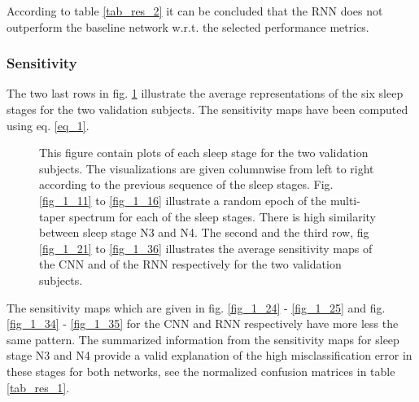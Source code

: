 According to table \ref{tab_res_2} it can be concluded that the RNN does not outperform the baseline network w.r.t. the selected performance metrics.

%

\subsubsection{Sensitivity}

The two last rows in fig. \ref{fig_1} illustrate the average representations of the six sleep stages for the two validation subjects. The sensitivity maps have been computed using eq. \ref{eq_1}.

\begin{figure*}[th!]
\centering

\caption{This figure contain plots of each sleep stage for the two validation subjects. The visualizations are given columnwise from left to right according to the previous sequence of the sleep stages. Fig. \ref{fig_1_11} to \ref{fig_1_16} illustrate a random epoch of the multi-taper spectrum for each of the sleep stages. There is high similarity between sleep stage N3 and N4.
The second and the third row, fig \ref{fig_1_21} to \ref{fig_1_36} illustrates the average sensitivity maps of the CNN and of the RNN respectively for the two validation subjects.}
\label{fig_1}
\end{figure*}

The sensitivity maps which are given in fig. \ref{fig_1_24} - \ref{fig_1_25} and fig. \ref{fig_1_34} - \ref{fig_1_35} for the CNN and RNN respectively have more less the same pattern. 
The summarized information from the sensitivity maps for sleep stage N3 and N4 provide a valid explanation of the high misclassification error in these stages for both networks, see the normalized confusion matrices in table \ref{tab_res_1}.


